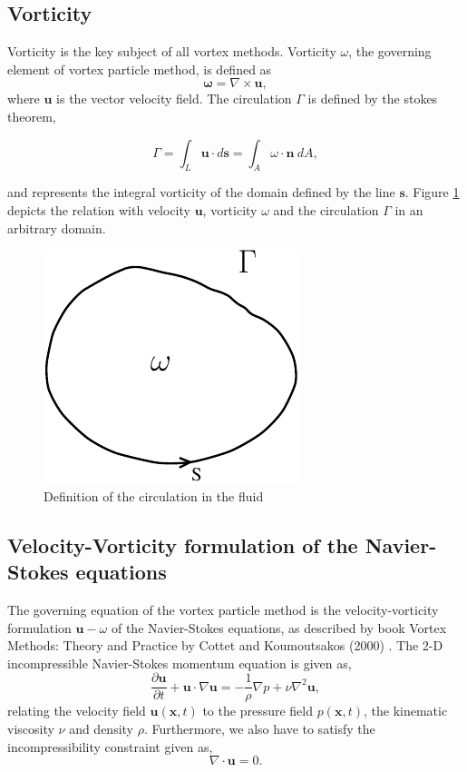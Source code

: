 \subsection{Vorticity}
Vorticity is the key subject of all vortex methods. Vorticity $\omega$, the governing element of vortex particle method, is defined as
	\begin{equation}
	\mathbf{\omega} = \nabla \times \mathbf{u},
	\end{equation}
where $\mathbf{u}$ is the vector velocity field. The circulation $\Gamma$ is defined by the stokes theorem,

	\begin{equation}
	\Gamma = \int_L\mathbf{u}\cdot d \mathbf{s}=\int_A\omega\cdot\mathbf{n}\ dA,
	\label{eq:definitionOfCirculation}
	\end{equation}

and represents the integral vorticity of the domain defined by the line $\mathbf{s}$. Figure \ref{fig:vorticityCirculation} depicts the relation with velocity $\mathbf{u}$, vorticity $\omega$ and the circulation $\Gamma$ in an arbitrary domain.

	\begin{figure}[t]
	\centering
	\includegraphics[width=0.3\linewidth]{./figures/lagrangian/vorticityCirculation.pdf}
	\caption{Definition of the circulation in the fluid}
	\label{fig:vorticityCirculation}
	\end{figure}

 
\subsection{Velocity-Vorticity formulation of the Navier-Stokes equations}
The governing equation of the vortex particle method is the velocity-vorticity formulation $\mathbf{u}-\omega$ of the Navier-Stokes equations, as described by book Vortex Methods: Theory and Practice by Cottet and Koumoutsakos (2000) \cite{Cottet2000a}. The 2-D incompressible Navier-Stokes momentum equation is given as,
	\begin{equation}
	\frac{\partial \mathbf{u}}{\partial t} + \mathbf{u}\cdot\nabla\mathbf{u} = - \frac{1}{\rho} \nabla p + \nu \nabla^2\mathbf{u},
	\label{eq:mom}
	\end{equation}
relating the velocity field $\mathbf{u}\left(\mathbf{x},t\right)$ to the pressure field $p\left(\mathbf{x},t\right)$, the kinematic viscosity $\nu$ and density $\rho$. Furthermore, we also have to satisfy the incompressibility constraint given as, 
	\begin{equation}
	\nabla\cdot\mathbf{u} = 0.
	\end{equation}

